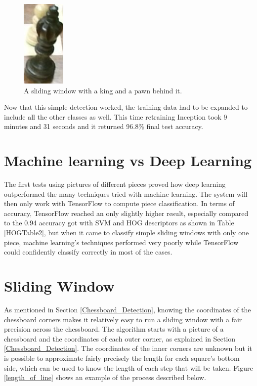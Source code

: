 \documentclass{l4proj}
\begin{document}
\begin{figure}[h!]
\centering
\includegraphics[scale=1]{king.jpg}
\caption{A sliding window with a king and a pawn behind it.}
\label{BlackKing}
\end{figure}

Now that this simple detection worked, the training data had to be expanded to include all the other classes as well. This time retraining Inception took 9 minutes and 31 seconds and it returned 96.8\% final test accuracy.


\section{Machine learning vs Deep Learning}

The first tests using pictures of different pieces proved how deep learning outperformed the many techniques tried with machine learning. The system will then only work with TensorFlow to compute piece classification. In terms of accuracy, TensorFlow reached an only slightly higher result, especially compared to the 0.94 accuracy got with SVM and HOG descriptors as shown in Table \ref{HOGTable2}, but when it came to classify simple sliding windows with only one piece, machine learning's techniques performed very poorly while TensorFlow could confidently classify correctly in most of the cases.

\section{Sliding Window} \label{Sliding_Window}

As mentioned in Section \ref{Chessboard_Detection}, knowing the coordinates of the chessboard corners makes it relatively easy to run a sliding window with a fair precision across the chessboard. The algorithm starts with a picture of a chessboard and the coordinates of each outer corner, as explained in Section \ref{Chessboard_Detection}. The coordinates of the inner corners are unknown but it is possible to approximate fairly precisely the length for each square's bottom side, which can be used to know the length of each step that will be taken. Figure \ref{length_of_line} shows an example of the process described below.
\end{document}
